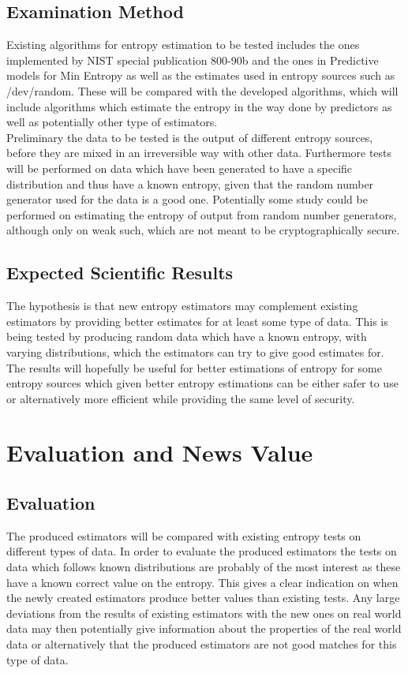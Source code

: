 \documentclass[a4paper,11pt]{report}
\begin{document}
\subsection*{Examination Method}
Existing algorithms for entropy estimation to be tested includes the ones
implemented by NIST special publication 800-90b\cite{800-90B} and the ones
in Predictive models for Min Entropy\cite{eprint-2015-26658} as well as 
the estimates used in entropy sources such as /dev/random. These will be 
compared with the developed algorithms, which will include algorithms which
estimate the entropy in the way done by predictors as well as potentially
other type of estimators. \\

\noindent
Preliminary the data to be tested is the output of different entropy sources,
before they are mixed in an irreversible way with other data. Furthermore
tests will be performed on data which have been generated to have a specific
distribution and thus have a known entropy, given that the random number 
generator used for the data is a good one. Potentially some study could be
performed on estimating the entropy of output from random number generators, 
although only on weak such, which are not meant to be cryptographically secure.
\subsection*{Expected Scientific Results}
The hypothesis is that new entropy estimators may complement existing 
estimators by providing better estimates for at least some type of data.
This is being tested by producing random data which have a known entropy,
with varying distributions, which the estimators can try to give good estimates
for. The results will hopefully be useful for better estimations of entropy for
some entropy sources which given better entropy estimations can be either safer
to use or alternatively more efficient while providing the same level of 
security.

\section*{Evaluation and News Value}
\subsection*{Evaluation}
The produced estimators will be compared with existing entropy tests on
different types of data. In order to evaluate the produced estimators the tests
on data which follows known distributions are probably of the most interest as
these have a known correct value on the entropy. This gives a clear indication
on when the newly created estimators produce better values than existing tests.
Any large deviations from the results of existing estimators with the new ones
on real world data may then potentially give information about the properties
of the real world data or alternatively that the produced estimators are not 
good matches for this type of data. 
\end{document}
